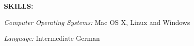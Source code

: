 {\large \textbf{SKILLS:}}
\begin{compactitem}
\item \textit{Computer Operating Systems:} Mac OS X, Linux and Windows
\item \textit{Language:} Intermediate German
\bigskip
\end{compactitem}
